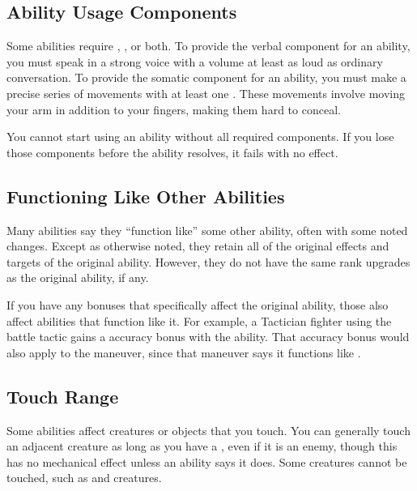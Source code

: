   \subsection{Ability Usage Components}\label{Ability Usage Components}
    Some abilities require , , or both.
    To provide the verbal component for an ability, you must speak in a strong voice with a volume at least as loud as ordinary conversation.
    To provide the somatic component for an ability, you must make a precise series of movements with at least one .
    These movements involve moving your arm in addition to your fingers, making them hard to conceal.

    You cannot start using an ability without all required components.
    If you lose those components before the ability resolves, it fails with no effect.

  \subsection{Functioning Like Other Abilities}\label{Functioning Like Other Abilities}
    Many abilities say they ``function like'' some other ability, often with some noted changes.
    Except as otherwise noted, they retain all of the original effects and targets of the original ability.
    However, they do not have the same rank upgrades as the original ability, if any.

    If you have any bonuses that specifically affect the original ability, those also affect abilities that function like it.
    For example, a Tactician fighter using the  battle tactic gains a  accuracy bonus with the  ability.
    That accuracy bonus would also apply to the  maneuver, since that maneuver says it functions like .

  \subsection{Touch Range}
    Some abilities affect creatures or objects that you touch.
    You can generally touch an adjacent creature as long as you have a , even if it is an enemy, though this has no mechanical effect unless an ability says it does.
    Some creatures cannot be touched, such as  and  creatures.

